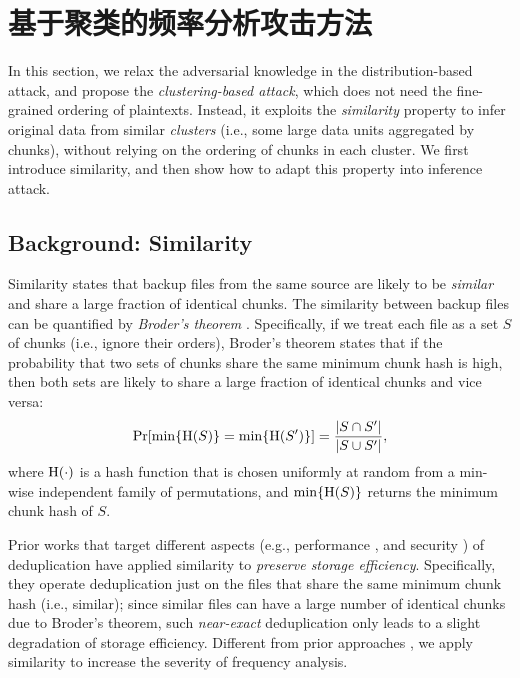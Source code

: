 \chapter{基于聚类的频率分析攻击方法}
\label{sec:ClusteringAttack}


In this section, we relax the adversarial knowledge in the distribution-based attack, and propose the {\em clustering-based attack}, which does not need the fine-grained ordering of plaintexts. Instead, it exploits the {\em similarity} property to infer original data from similar {\em clusters} (i.e., some large data units aggregated by chunks), without relying on the ordering of chunks in each cluster. We first introduce similarity, and then show how to adapt this property into inference attack. 




\section{Background: Similarity}
\label{sec:similarity}
Similarity \cite{bhagwat09} states that backup files from the same source are likely to be {\em similar} and share a large fraction of identical chunks. The similarity between backup files can be quantified by {\em Broder's theorem} \cite{broder97}. Specifically, if we treat each file as a set $S$ of chunks (i.e., ignore their orders), Broder's theorem states that if the probability that two sets of chunks share the same minimum chunk hash is high, then both sets are likely to share a large fraction of identical chunks and vice versa:  
\begin{eqnarray}
	\Pr[\min\{{\rm H}(S)\} = \min\{{\rm H}(S')\} ] = \frac{|S \cap S'|}{|S \cup S'|}, \nonumber
	\label{eq:broder}
\end{eqnarray}
where ${\rm H}(\cdot)$ is a hash function that is chosen uniformly at random from a min-wise independent family of permutations, and $\min\{{\rm H}(S)\}$ returns the minimum chunk hash of $S$. 

Prior works that target different aspects (e.g., performance \cite{qin17,xia11,bhagwat09}, and security \cite{li17}) of deduplication  have applied similarity to {\em preserve storage efficiency}. Specifically, they operate deduplication just on the files that share the same minimum chunk hash (i.e., similar); since similar files can have a large number of identical chunks due to Broder's theorem, such {\em near-exact} deduplication only leads to a slight degradation of storage efficiency. Different from  prior approaches \cite{qin17,xia11,bhagwat09,li17}, we apply similarity to increase the severity of frequency analysis.   


